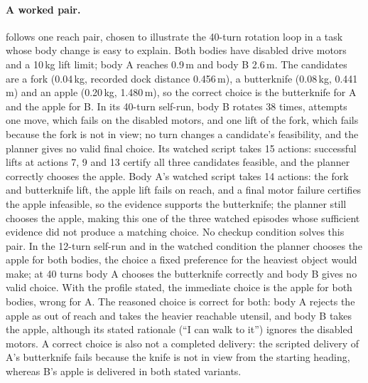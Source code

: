 \documentclass{article}
\begin{document}
\paragraph{A worked pair.}  follows one reach pair, chosen to illustrate the 40-turn rotation loop in a task whose body change is easy to explain. Both bodies have disabled drive motors and a 10\,kg lift limit; body A reaches 0.9\,m and body B 2.6\,m. The candidates are a fork (0.04\,kg, recorded dock distance 0.456\,m), a butterknife (0.08\,kg, 0.441\,m) and an apple (0.20\,kg, 1.480\,m), so the correct choice is the butterknife for A and the apple for B. In its 40-turn self-run, body B rotates 38 times, attempts one move, which fails on the disabled motors, and one lift of the fork, which fails because the fork is not in view; no turn changes a candidate's feasibility, and the planner gives no valid final choice. Its watched script takes 15 actions: successful lifts at actions 7, 9 and 13 certify all three candidates feasible, and the planner correctly chooses the apple. Body A's watched script takes 14 actions: the fork and butterknife lift, the apple lift fails on reach, and a final motor failure certifies the apple infeasible, so the evidence supports the butterknife; the planner still chooses the apple, making this one of the three watched episodes whose sufficient evidence did not produce a matching choice. No checkup condition solves this pair. In the 12-turn self-run and in the watched condition the planner chooses the apple for both bodies, the choice a fixed preference for the heaviest object would make; at 40 turns body A chooses the butterknife correctly and body B gives no valid choice. With the profile stated, the immediate choice is the apple for both bodies, wrong for A. The reasoned choice is correct for both: body A rejects the apple as out of reach and takes the heavier reachable utensil, and body B takes the apple, although its stated rationale (``I can walk to it'') ignores the disabled motors. A correct choice is also not a completed delivery: the scripted delivery of A's butterknife fails because the knife is not in view from the starting heading, whereas B's apple is delivered in both stated variants.
\end{document}
